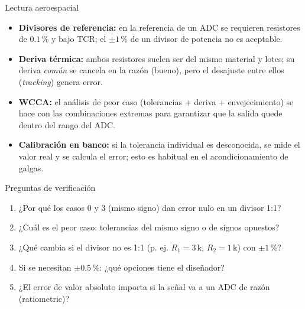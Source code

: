 \documentclass[aspectratio=169]{beamer}
\begin{document}
\begin{frame}{Lectura aeroespacial}
  \begin{itemize}
    \item \textbf{Divisores de referencia:} en la referencia de un ADC se requieren resistores de
      $0.1\,\text{\%}$ y bajo TCR; el $\pm 1\,\text{\%}$ de un divisor de potencia no es aceptable.
    \item \textbf{Deriva térmica:} ambos resistores suelen ser del mismo material y lotes; su
      deriva \emph{común} se cancela en la razón (bueno), pero el desajuste entre ellos (\emph{tracking})
      genera error.
    \item \textbf{WCCA:} el análisis de peor caso (tolerancias + deriva + envejecimiento) se hace con
      las combinaciones extremas para garantizar que la salida quede dentro del rango del ADC.
    \item \textbf{Calibración en banco:} si la tolerancia individual es desconocida, se mide el valor
      real y se calcula el error; esto es habitual en el acondicionamiento de galgas.
  \end{itemize}
\end{frame}

\begin{frame}{Preguntas de verificación}
  \begin{enumerate}
    \item ¿Por qué los casos 0 y 3 (mismo signo) dan error nulo en un divisor 1:1?
    \item ¿Cuál es el peor caso: tolerancias del mismo signo o de signos opuestos?
    \item ¿Qué cambia si el divisor no es 1:1 (p. ej. $R_1 = 3\,\text{k}$, $R_2 = 1\,\text{k}$) con $\pm 1\,\text{\%}$?
    \item Si se necesitan $\pm 0.5\,\text{\%}$: ¿qué opciones tiene el diseñador?
    \item ¿El error de valor absoluto importa si la señal va a un ADC de razón (ratiometric)?
  \end{enumerate}
\end{frame}
\end{document}
